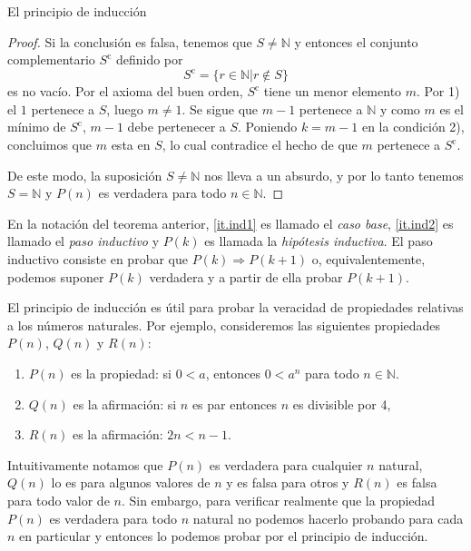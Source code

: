 \begin{section}{El principio de inducción}
\begin{proof}
    Si la conclusión es falsa, tenemos que $S \not= \mathbb N$ y entonces
    el conjunto complementario $S^{\text{c}}$ definido por
    $$
    S^{\text{c}}= \{ r \in \mathbb N | r\not\in S\}
    $$
    es no vacío. Por el axioma del buen orden, $S^{\text{c}}$ tiene un menor elemento $m$. Por 1) el $1$ pertenece a $S$, luego $m\not=1$. Se sigue que $m-1$ pertenece a $\mathbb N$ y como $m$ es el mínimo de $S^{\text{c}}$, $m-1$ debe pertenecer a $S$. Poniendo $k=m-1$ en la condición 2), concluimos que $m$ esta en $S$, lo cual contradice el hecho de que $m$ pertenece a $S^{\text{c}}$. 
    
    De este modo, la suposición $S \not= \mathbb N$ nos lleva a un absurdo, y por lo tanto tenemos $S= \mathbb N$ y $P(n)$ es verdadera para todo $n \in \mathbb N$.
    \end{proof}
    
    
    En la notación del teorema anterior, \ref{it.ind1} es llamado  el \textit{caso base}, \ref{it.ind2} es llamado el  \textit{paso inductivo} y $P(k)$ es llamada la \textit{hipótesis inductiva}. El paso inductivo  consiste en probar que $P(k) \Rightarrow P(k + 1)$ o, equivalentemente, podemos suponer $P(k)$ verdadera y a partir de ella probar $P(k + 1)$. 
    

El principio de inducción es útil para probar la veracidad de propiedades relativas a los números naturales. Por ejemplo, consideremos las siguientes propiedades $P(n)$, $Q(n)$ y $R(n)$:
\begin{enumerate}[label=\textit{\alph*)}]
\item $P(n)$ es la propiedad: si $0<a$,  entonces $0<a^n$ para todo $n \in \mathbb N$.
\item $Q(n)$ es la afirmación: si $n$ es par entonces $n$ es divisible por 4,
\item $R(n)$ es la afirmación: $2n < n- 1$.
\end{enumerate}

Intuitivamente notamos que $P(n)$ es verdadera para cualquier $n$ natural, $Q(n)$ lo es para algunos valores de $n$ y es falsa para otros y $R(n)$ es falsa para todo valor de $n$. Sin embargo, para verificar realmente que la propiedad $P(n)$ es verdadera para todo $n$ natural no podemos hacerlo probando para cada $n$ en particular y  entonces lo podemos probar por el principio de inducción. 




\end{section}
